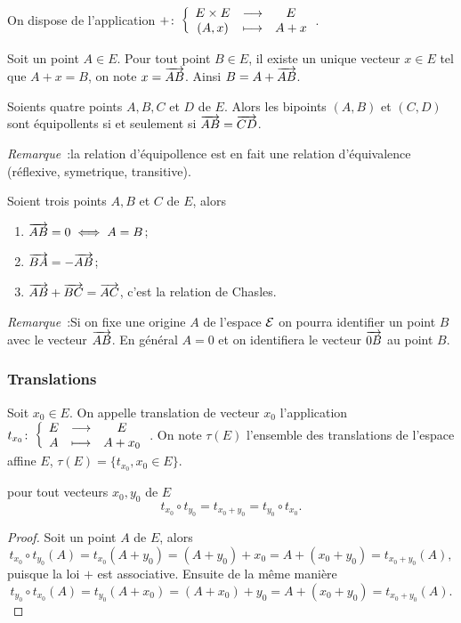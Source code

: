 On dispose de l'application \(+\colon \left\{\begin{array}{ccc} E\times E & \longrightarrow &E\\ (A,x) & \longmapsto & A+x \end{array} \right.\).

\begin{defdef}
  Soit un point \(A \in E\). Pour tout point \(B \in E\), il existe un unique vecteur \(x \in E\) tel que \(A+x=B\), on note \(x=\overrightarrow{AB}\). Ainsi \(B=A+\overrightarrow{AB}\).
\end{defdef}
\begin{defdef}
  Soients quatre points \(A,B,C\) et \(D\) de \(E\). Alors les bipoints \((A,B)\) et \((C,D)\) sont équipollents si et seulement si \(\overrightarrow{AB}=\overrightarrow{CD}\).
\end{defdef}

\emph{Remarque}~:la relation d'équipollence est en fait une relation d'équivalence (réflexive, symetrique, transitive).

\begin{prop}
  Soient trois points \(A,B\) et \(C\) de \(E\), alors
  \begin{enumerate}
  \item \(\overrightarrow{AB}=0 \iff A=B\);
  \item \(\overrightarrow{BA}=-\overrightarrow{AB}\);
  \item \(\overrightarrow{AB}+\overrightarrow{BC}=\overrightarrow{AC}\), c'est la relation de Chasles.
  \end{enumerate}
\end{prop}

\emph{Remarque}~:Si on fixe une origine \(A\) de l'espace \(\mathcal{E}\) on pourra identifier un point \(B\) avec le vecteur \(\overrightarrow{AB}\). En général \(A=0\) et on identifiera le vecteur \(\overrightarrow{0B}\) au point \(B\).

\subsubsection{Translations}

\begin{defdef}
  Soit \(x_0 \in E\). On appelle translation de vecteur \(x_0\) l'application \(t_{x_0}\colon \left\{\begin{array}{ccc} E & \longrightarrow &E\\ A & \longmapsto & A+x_0 \end{array} \right.\). On note \(\tau(E)\) l'ensemble des translations de l'espace affine \(E\), \(\tau(E)=\{t_{x_0}, x_0 \in E\}\).
\end{defdef}

\begin{prop}\label{prop:associativitevec}
  pour tout vecteurs \(x_0, y_0\) de \(E\)
  \begin{equation}
    t_{x_0} \circ t_{y_0} = t_{x_0 +y_0} = t_{y_0} \circ t_{x_0}.
  \end{equation}
\end{prop}
\begin{proof}
  Soit un point \(A\) de \(E\), alors
  \begin{equation}
    t_{x_0} \circ t_{y_0} (A)=t_{x_0}(A+y_0) = (A+y_0)+x_0 = A+(x_0+y_0) =t_{x_0+y_0}(A),
  \end{equation}
  puisque la loi \(+\) est associative. Ensuite de la même manière
  \begin{equation}
    t_{y_0} \circ t_{x_0} (A)=t_{y_0}(A+x_0) = (A+x_0)+y_0 = A+(x_0+y_0)=t_{x_0+y_0}(A).
  \end{equation}
\end{proof}

